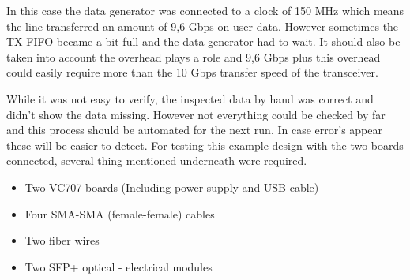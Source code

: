 	In this case the data generator was connected to a clock of 150 MHz which means the line transferred an amount of 9,6 Gbps on user data. However sometimes the TX FIFO became a bit full and the data generator had to wait. It should also be taken into account the overhead plays a role and 9,6 Gbps plus this overhead could easily require more than the 10 Gbps transfer speed of the transceiver. 
	
	While it was not easy to verify, the inspected data by hand was correct and didn't show the data missing. However not everything could be checked by far and this process should be automated for the next run. In case error's appear these will be easier to detect.
	\vspace{\baselineskip} \newline
	For testing this example design with the two boards connected, several thing mentioned underneath were required.
	\begin{itemize}
		\item Two VC707 boards (Including power supply and USB cable)
		\item Four SMA-SMA (female-female) cables
		\item Two fiber wires
		\item Two SFP+ optical - electrical modules
	\end{itemize}
	
\newpage
